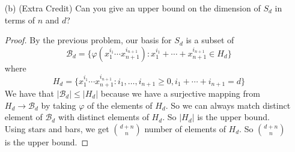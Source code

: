 \documentclass{article}
\begin{document}
\begin{itemize}
        \item [(b)] (Extra Credit) Can you give an upper bound on the dimension of $S_{d}$ in terms of $n$ and $d$? 
            \begin{proof}
                By the previous problem, our basis for $S_{d}$ is a subset of 
                    \begin{equation*}
                         \mathcal{B}_{d} = \{\varphi (x_{1}^{i_{1}}\cdots x_{n + 1}^{i_{n + 1}}) : x_{1}^{i_{1}} + \cdots + x_{n + 1}^{i_{n + 1}} \in H_{d}\}
                    \end{equation*}
                where
                    \begin{equation*}
                        H_{d} = \{x_{1}^{i_{1}} \cdots x_{n + 1}^{i_{n + 1}} : i_{1}, \ldots, i_{n + 1} \geq 0, i_{1} + \cdots+ i_{n + 1} = d\}
                    \end{equation*}
                We have that $\lvert \mathcal{B}_{d} \rvert \leq \lvert H_{d} \rvert$ because we have a surjective mapping from $H_{d} \rightarrow \mathcal{B}_{d}$ by taking $\varphi$ of the elements of $H_{d}$. So we can always match distinct element of $\mathcal{B}_{d}$ with distinct elements of $H_{d}$. So $\lvert H_{d} \rvert$ is the upper bound. Using stars and bars, we get $\binom{d + n}{n}$ number of elements of $H_{d}$. So $\binom{d + n}{n}$ is the upper bound.
            \end{proof}
    \end{itemize}
\end{document}
